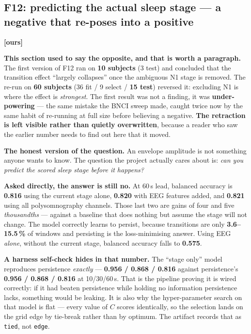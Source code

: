 \documentclass[11pt]{article}
\begin{document}
\subsection{F12: predicting the actual sleep stage --- a negative that re-poses into a positive} \textbf{[ours]}

\begin{keybox}
\textbf{This section used to say the opposite, and that is worth a paragraph.}
The first version of F12 ran on \textbf{10 subjects} (3 test) and concluded that
the transition effect ``largely collapses'' once the ambiguous N1 stage is
removed. The re-run on \textbf{60 subjects} (36 fit / 9 select / \textbf{15
test}) reversed it: excluding N1 is where the effect is \emph{strongest}. The
first result was not a finding, it was \textbf{under-powering} --- the same
mistake the BNCI sweep made, caught twice now by the same habit of re-running at
full size before believing a negative. \textbf{The retraction is left visible
rather than quietly overwritten}, because a reader who saw the earlier number
needs to find out here that it moved.
\end{keybox}

\textbf{The honest version of the question.} An envelope amplitude is not
something anyone wants to know. The question the project actually cares about is:
\emph{can you predict the scored sleep stage before it happens?}

\textbf{Asked directly, the answer is still no.} At 60\,s lead, balanced accuracy
is \textbf{0.816} using the current stage alone, \textbf{0.820} with EEG features
added, and \textbf{0.821} using all polysomnography channels. Those last two are
gains of four and five \emph{thousandths} --- against a baseline that does nothing
but assume the stage will not change. The model correctly learns to persist,
because transitions are only \textbf{3.6--15.5\,\%} of windows and persisting is
the loss-minimising answer. Using EEG \emph{alone}, without the current stage,
balanced accuracy falls to \textbf{0.575}.

\begin{keybox}
\textbf{A harness self-check hides in that number.} The ``stage only'' model
reproduces persistence \emph{exactly} --- \textbf{0.956 / 0.868 / 0.816} against
persistence's \textbf{0.956 / 0.868 / 0.816} at 10/30/60\,s. That is the pipeline
proving it is wired correctly: if it had beaten persistence while holding no
information persistence lacks, something would be leaking. It is also why the
hyper-parameter search on that model is flat --- every value of $C$ scores
identically, so the selection lands on the grid edge by tie-break rather than by
optimum. The artifact records that as \texttt{tied}, not \texttt{edge}.
\end{keybox}
\end{document}
